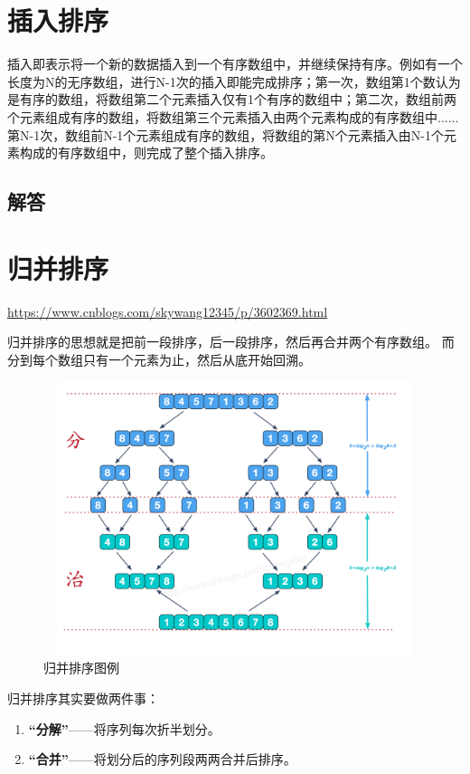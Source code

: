 \documentclass[UTF8,a4paper,12pt]{ctexbook}
\begin{document}
\section{插入排序}
	
	插入即表示将一个新的数据插入到一个有序数组中，并继续保持有序。例如有一个长度为N的无序数组，进行N-1次的插入即能完成排序；第一次，数组第1个数认为是有序的数组，将数组第二个元素插入仅有1个有序的数组中；第二次，数组前两个元素组成有序的数组，将数组第三个元素插入由两个元素构成的有序数组中......第N-1次，数组前N-1个元素组成有序的数组，将数组的第N个元素插入由N-1个元素构成的有序数组中，则完成了整个插入排序。
	
	\subsection{解答}
	
\section{归并排序}
	\url{https://www.cnblogs.com/skywang12345/p/3602369.html}
	
	归并排序的思想就是把前一段排序，后一段排序，然后再合并两个有序数组。 而分到每个数组只有一个元素为止，然后从底开始回溯。
	
	\begin{figure}[H]
		\centering
		\includegraphics[width=15cm,height=8cm]{mergeSort}
		\caption{归并排序图例}
	\end{figure}
	
	归并排序其实要做两件事：
	\begin{enumerate}[itemindent = 2em]
	  \item \textbf{“分解”}——将序列每次折半划分。
	  \item \textbf{“合并”}——将划分后的序列段两两合并后排序。
	\end{enumerate}
	
\end{document}
